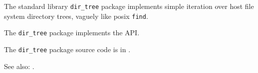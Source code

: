 
The standard library {\tt dir\_tree} package implements simple iteration 
over host file system directory trees, vaguely like posix {\tt find}.

The {\tt dir\_tree} package implements the  API.

The {\tt dir\_tree} package source code is in .

See also:   .


